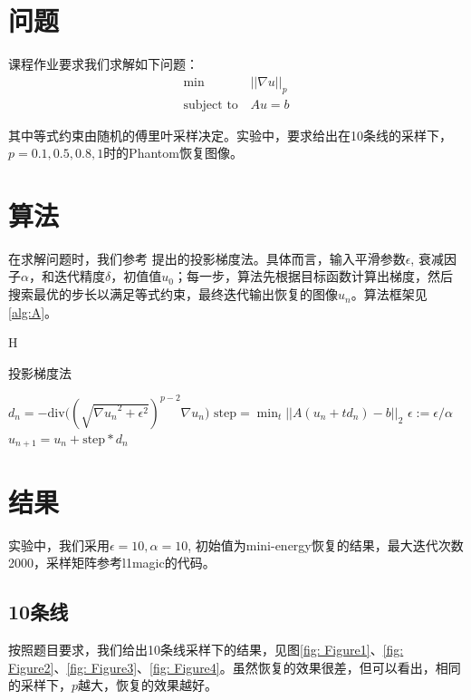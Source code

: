 \documentclass{ctexart}
\begin{document}
\section{问题}

课程作业要求我们求解如下问题：
\begin{equation}
\begin{split}
	\min &||\nabla u||_p \\
	\mathrm{subject \,\, to} \, &Au = b 
\end{split}
\end{equation}

其中等式约束由随机的傅里叶采样决定。实验中，要求给出在10条线的采样下，$p=0.1, 0.5, 0.8, 1$时的Phantom恢复图像。

\section{算法}
在求解问题时，我们参考\cite {pa} 提出的投影梯度法。具体而言，输入平滑参数$\epsilon$, 衰减因子$\alpha$，和迭代精度$\delta$，初值值$u_0$；每一步，算法先根据目标函数计算出梯度，然后搜索最优的步长以满足等式约束，最终迭代输出恢复的图像$u_n$。算法框架见\ref{alg:A}。

\begin{algorithm}{H}
\caption{投影梯度法}
\label{alg:A}
\begin{algorithmic} 
\REPEAT 
\STATE  $d_n = - \mathrm{div} \Big( ( \sqrt{{\nabla u_n}^2 + \epsilon^2} )^{p-2} \nabla u_n \Big)$ 
\STATE  $\mathrm{step}= \min_t{||A(u_n+t d_n) - b||_2} $
\ENDIF
{}
\STATE $\epsilon := \epsilon / \alpha$
\ENDIF
\STATE $u_{n+1} = u_n + \mathrm{step}*d_n$
\end{algorithmic}
\end{algorithm}


\section{结果}
 实验中，我们采用$\epsilon = 10, \alpha = 10$, 初始值为mini-energy恢复的结果，最大迭代次数2000，采样矩阵参考l1magic的代码。 
\subsection{10条线}

按照题目要求，我们给出10条线采样下的结果，见图\ref{fig: Figure1}、\ref{fig: Figure2}、\ref{fig: Figure3}、\ref{fig: Figure4}。虽然恢复的效果很差，但可以看出，相同的采样下，$p$越大，恢复的效果越好。
\end{document}
